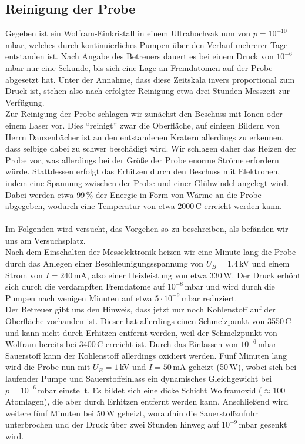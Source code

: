 \documentclass[german, parskip=full]{scrartcl}
\begin{document}
\subsection{Reinigung der Probe}
Gegeben ist ein Wolfram-Einkristall in einem Ultrahochvakuum von $p=10^{-10}\,$mbar, welches durch kontinuierliches Pumpen über den Verlauf mehrerer Tage entstanden ist. Nach Angabe des Betreuers dauert es bei einem Druck von $10^{-6}\,$mbar nur eine Sekunde, bis sich eine Lage an Fremdatomen auf der Probe abgesetzt hat. Unter der Annahme, dass diese Zeitskala invers proportional zum Druck ist, stehen also nach erfolgter Reinigung etwa drei Stunden Messzeit zur Verfügung.\\
Zur Reinigung der Probe schlagen wir zunächst den Beschuss mit Ionen oder einem Laser vor. Dies ``reinigt'' zwar die Oberfläche, auf einigen Bildern von Herrn Danzenbächer ist an den entstandenen Kratern allerdings zu erkennen, dass selbige dabei zu schwer beschädigt wird. Wir schlagen daher das Heizen der Probe vor, was allerdings bei der Größe der Probe enorme Ströme erfordern würde. Stattdessen erfolgt das Erhitzen durch den Beschuss mit Elektronen, indem eine Spannung zwischen der Probe und einer Glühwindel angelegt wird. Dabei werden etwa 99\,\% der Energie in Form von Wärme an die Probe abgegeben, wodurch eine Temperatur von etwa 2000\,\degree C erreicht werden kann.\\ \\
Im Folgenden wird versucht, das Vorgehen so zu beschreiben, als befänden wir uns am Versuchsplatz.\\
Nach dem Einschalten der Messelektronik heizen wir eine Minute lang die Probe durch das Anlegen einer Beschleunigungsspannung von $U_B=1.4\,$kV und einem Strom von $I=240\,$mA, also einer Heizleistung von etwa 330\,W.  Der Druck erhöht sich durch die verdampften Fremdatome auf $10^{-8}\,$mbar und wird durch die Pumpen nach wenigen Minuten auf etwa $5\cdot 10^{-9}\,$mbar reduziert.\\
Der Betreuer gibt uns den Hinweis, dass jetzt nur noch Kohlenstoff auf der Oberfläche vorhanden ist. Dieser hat allerdings einen Schmelzpunkt von 3550\,\degree C und kann nicht durch Erhitzen entfernt werden, weil der Schmelzpunkt von Wolfram bereits bei 3400\,\degree C erreicht ist. Durch das Einlassen von $10^{-6}\,$mbar Sauerstoff kann der Kohlenstoff allerdings oxidiert werden. Fünf Minuten lang wird die Probe nun mit $U_B=1\,$kV und $I=50\,$mA geheizt (50\,W), wobei sich bei laufender Pumpe und Sauerstoffeinlass ein dynamisches Gleichgewicht bei $p=10^{-6}\,$mbar einstellt. Es bildet sich eine dicke Schicht Wolframoxid ($\approx 100$ Atomlagen), die aber durch Erhitzen entfernt werden kann. Anschließend wird weitere fünf Minuten bei 50\,W geheizt, woraufhin die Sauerstoffzufuhr unterbrochen und der Druck über zwei Stunden hinweg auf $10^{-9}\,$mbar gesenkt wird.\\ \\
\end{document}
